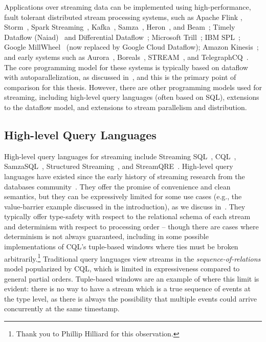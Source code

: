 Applications over streaming data can be implemented using
high-performance, fault tolerant distributed stream processing systems, such as
Apache
Flink \cite{Flink2015,Flink2017,Flink},
Storm~\cite{Storm},
Spark Streaming~\cite{Spark2013,SparkStreaming},
Kafka~\cite{garg2013apache},
Samza~\cite{Samza2017},
Heron~\cite{kulkarni2015twitter-heron,Heron},
and Beam~\cite{Beam};
Timely Dataflow (Naiad)~\cite{Naiad2013,Timely}
and
Differential Dataflow~\cite{mcsherry2013differential};
Microsoft
Trill~\cite{chandramouli2014trill};
IBM SPL~\cite{HAG2013SPL};
Google MillWheel~\cite{MillWheel} (now replaced by Google Cloud Dataflow);
Amazon Kinesis~\cite{AmazonKinesis};
and early systems such as
Aurora~\cite{Aurora,AuroraWeb},
Boreals~\cite{Borealis,BorealisWeb},
STREAM~\cite{STREAM2004},
and TelegraphCQ~\cite{Telegraph}.
The core programming model for these systems is typically based on dataflow with autoparallelization, as discussed in~,
and this is the primary point of comparison for this thesis.
However, there are other programming models used for streaming, including
high-level query languages (often based on SQL),
extensions to the dataflow model,
and extensions to stream parallelism and distribution.

\subsection{High-level Query Languages}

High-level query languages for streaming include Streaming SQL~\cite{jain2008towards,begoli2019one}, CQL~\cite{arasu2003cql,ABW2006CQL}, SamzaSQL~\cite{pathirage2016samzasql}, Structured Streaming~\cite{armbrust2018structured},
and StreamQRE~\cite{StreamQRE}.
High-level query languages have existed since the early history
of streaming research from the databases community~\cite{stonebraker20058}.
They offer the promise of convenience and clean semantics, but they can be expressively limited for some use cases (e.g., the value-barrier example discussed in the introduction), as we discuss in~.
They typically offer type-safety with respect to the relational schema of each stream and determinism with respect to processing order --
though there are cases where determinism is not always guaranteed, including in some possible implementations of CQL's tuple-based windows where ties must be broken arbitrarily.\footnote{Thank you to Phillip Hilliard for this observation.}
Traditional query languages view streams in the \emph{sequence-of-relations} model popularized by CQL, which is limited in expressiveness compared to general partial orders.
Tuple-based windows are an example of where this limit is evident: there is no way to have a stream which is a true sequence of events at the type level, as there is always the possibility that multiple events could arrive concurrently at the same timestamp.

